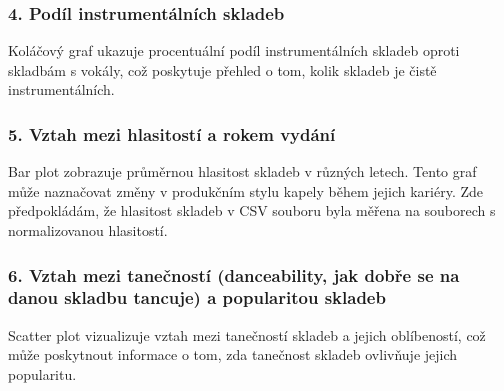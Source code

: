 \documentclass[a4paper,12pt]{article}
\begin{document}
\subsubsection{4. Podíl instrumentálních skladeb}
Koláčový graf ukazuje procentuální podíl instrumentálních skladeb oproti skladbám s vokály, což poskytuje přehled o tom, kolik skladeb je čistě instrumentálních.
\subsubsection{5. Vztah mezi hlasitostí a rokem vydání}
Bar plot zobrazuje průměrnou hlasitost skladeb v různých letech. Tento graf může naznačovat změny v produkčním stylu kapely během jejich kariéry. Zde předpokládám, že hlasitost skladeb v CSV souboru byla měřena na souborech s normalizovanou hlasitostí.
\subsubsection{6. Vztah mezi tanečností (danceability, jak dobře se na danou skladbu tancuje) a popularitou skladeb}
Scatter plot vizualizuje vztah mezi tanečností skladeb a jejich oblíbeností, což může poskytnout informace o tom, zda tanečnost skladeb ovlivňuje jejich popularitu.
	
\end{document}
